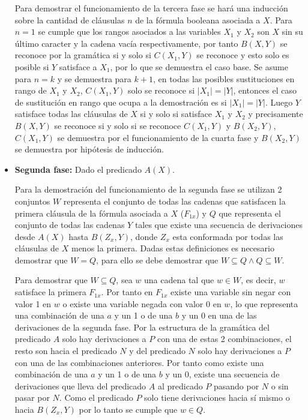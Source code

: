 \begin{itemize}
          Para demostrar el funcionamiento de la tercera fase se hará una inducción sobre la cantidad de cláusulas $n$ de
          la fórmula booleana asociada a $X$. Para $n=1$ se cumple que los
          rangos asociados a las variables $X_1$ y $X_2$ son $X$ sin su último caracter y la cadena vacía respectivamente, por
          tanto $B(X,Y)$ se reconoce por la gramática si y solo si $C(X_1,Y)$ se reconoce y esto solo es posible si $Y$ satisface a
          $X_1$, por lo que se demuestra el caso base. Se asume para $n=k$ y se demuestra para $k+1$, en todas las posibles sustituciones en
          rango de $X_1$ y $X_2$, $C(X_1,Y)$ solo se reconoce si $|X_1|=|Y|$, entonces el caso de sustitución en rango que ocupa a la demostración
          es si $|X_1|=|Y|$. Luego $Y$ satisface todas las cláusulas de $X$ si y solo si satisface $X_1$ y $X_2$ y precisamente
          $B(X,Y)$ se reconoce si y solo si se reconoce $C(X_1,Y)$ y $B(X_2,Y)$, $C(X_1,Y)$ se demuestra por el funcionamiento de la
          cuarta fase y  $B(X_2,Y)$ se demuestra por hipótesis de inducción.

    \item \textbf{Segunda fase:} Dado el predicado $A(X)$.

          Para la demostración del funcionamiento de la segunda fase se utilizan 2 conjuntos $W$ representa el conjunto de todas
          las cadenas que satisfacen la primera cláusula de la fórmula asociada a $X$ ($F_{1x}$) y $Q$ que representa el conjunto de todas las cadenas $Y$
          tales que existe una secuencia de derivaciones desde $A(X)$ hasta $B(Z_x,Y)$, donde $Z_x$ esta
          conformada por todas las cláusulas de $X$ menos la primera. Dadas estas definiciones es necesario
          demostrar que $W=Q$, para ello se debe demostrar que $W\subseteq Q \wedge Q\subseteq W$.

          Para demostrar que $W\subseteq Q$, sea $w$ una cadena tal que $w\in W$, es decir, $w$ satisface la primera $F_{1x}$. Por tanto en
          $F_{1x}$ existe una variable sin negar con valor 1 en $w$ o existe una variable negada con valor 0 en $w$, lo que representa
          una combinación de una $a$ y un 1 o de una $b$ y un 0 en una de las derivaciones de la segunda fase. Por la estructura
          de la gramática del predicado $A$ solo hay derivaciones a $P$ con una de estas 2 combinaciones, el resto son hacia
          el predicado $N$ y del predicado $N$ solo hay derivaciones a $P$ con una de las combinaciones anteriores. Por tanto como
          existe una combinación de una $a$ y un 1 o de una $b$ y un 0, existe una secuencia de derivaciones que lleva del predicado $A$ al predicado $P$
          pasando por $N$ o sin pasar por $N$. Como el predicado $P$ solo tiene derivaciones hacia sí mismo o hacia $B(Z_x,Y)$ por lo tanto se cumple
          que $w\in Q$.


\end{itemize}
